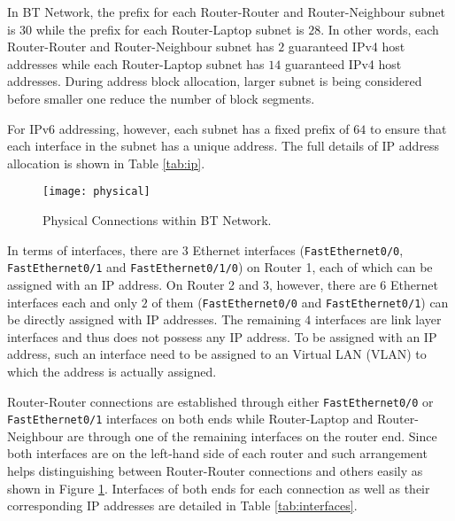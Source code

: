 In BT Network, the prefix for each Router-Router and Router-Neighbour subnet is $30$ while the prefix for each Router-Laptop subnet is $28$. In other words, each Router-Router and Router-Neighbour subnet has $2$ guaranteed IPv4 host addresses while each Router-Laptop subnet has $14$ guaranteed IPv4 host addresses. During address block allocation, larger subnet is being considered before smaller one reduce the number of block segments.

For IPv6 addressing, however, each subnet has a fixed prefix of $64$ to ensure that each interface in the subnet has a unique address. The full details of IP address allocation is shown in Table \ref{tab:ip}.

\begin{figure}[ht!]
    \centering
    \texttt{[image: physical]}
    \caption{Physical Connections within BT Network.}
    \label{fig:physical}
\end{figure}

In terms of interfaces, there are $3$ Ethernet interfaces (\texttt{FastEthernet0/0}, \texttt{FastEthernet0/1} and \texttt{FastEthernet0/1/0}) on Router 1, each of which can be assigned with an IP address. On Router 2 and 3, however, there are $6$ Ethernet interfaces each and only $2$ of them (\texttt{FastEthernet0/0} and \texttt{FastEthernet0/1}) can be directly assigned with IP addresses. 
The remaining $4$ interfaces are link layer interfaces and thus does not possess any IP address.
To be assigned with an IP address, such an interface need to be assigned to an Virtual LAN (VLAN) to which the address is actually assigned.

Router-Router connections are established through either \texttt{FastEthernet0/0} or \texttt{FastEthernet0/1} interfaces on both ends while Router-Laptop and Router-Neighbour are through one of the remaining interfaces on the router end.
Since both interfaces are on the left-hand side of each router and such arrangement helps distinguishing between Router-Router connections and others easily as shown in Figure \ref{fig:physical}. Interfaces of both ends for each connection as well as their corresponding IP addresses are detailed in Table \ref{tab:interfaces}.

